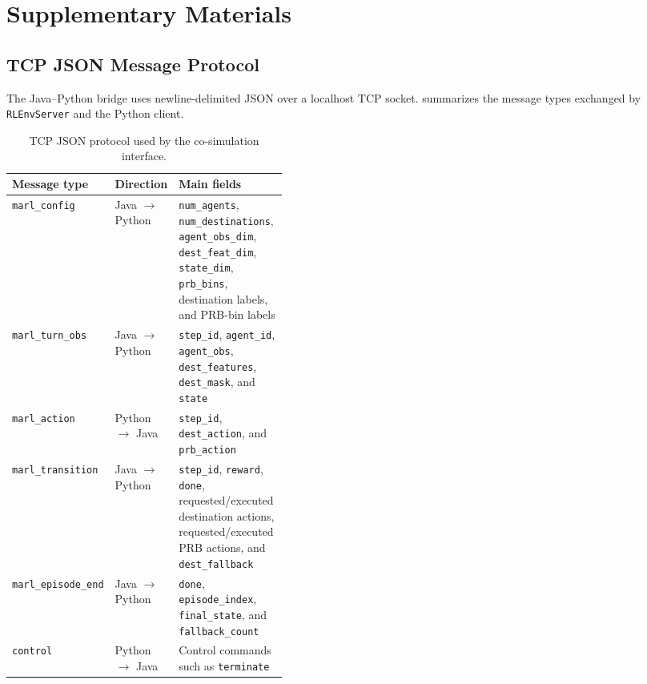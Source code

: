 \newpage
\section{Supplementary Materials}
\label{sec:appendix}

\subsection{TCP JSON Message Protocol}
\label{subsec:appendix-tcp}

The Java--Python bridge uses newline-delimited JSON over a localhost TCP socket.  summarizes the message types exchanged by \texttt{RLEnvServer} and the Python client.

\begin{table}[htbp]
    \centering
    \small
    \renewcommand{\arraystretch}{1.12}
    \begin{tabularx}{0.98\linewidth}{>{\raggedright\arraybackslash}p{0.22\linewidth}>{\raggedright\arraybackslash}p{0.18\linewidth}>{\raggedright\arraybackslash}X}
        \hline
        \textbf{Message type} & \textbf{Direction} & \textbf{Main fields} \\
        \hline
        \texttt{marl\_config} & Java \(\rightarrow\) Python & \texttt{num\_agents}, \texttt{num\_destinations}, \texttt{agent\_obs\_dim}, \texttt{dest\_feat\_dim}, \texttt{state\_dim}, \texttt{prb\_bins}, destination labels, and PRB-bin labels \\
        \texttt{marl\_turn\_obs} & Java \(\rightarrow\) Python & \texttt{step\_id}, \texttt{agent\_id}, \texttt{agent\_obs}, \texttt{dest\_features}, \texttt{dest\_mask}, and \texttt{state} \\
        \texttt{marl\_action} & Python \(\rightarrow\) Java & \texttt{step\_id}, \texttt{dest\_action}, and \texttt{prb\_action} \\
        \texttt{marl\_transition} & Java \(\rightarrow\) Python & \texttt{step\_id}, \texttt{reward}, \texttt{done}, requested/executed destination actions, requested/executed PRB actions, and \texttt{dest\_fallback} \\
        \texttt{marl\_episode\_end} & Java \(\rightarrow\) Python & \texttt{done}, \texttt{episode\_index}, \texttt{final\_state}, and \texttt{fallback\_count} \\
        \texttt{control} & Python \(\rightarrow\) Java & Control commands such as \texttt{terminate} \\
        \hline
    \end{tabularx}
    \caption{TCP JSON protocol used by the co-simulation interface.}
    \label{tab:tcp-schema}
\end{table}

